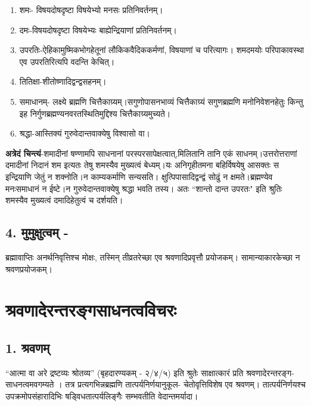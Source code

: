 \begin{enumerate}	
\item शमः- विषयदोषदृष्टा 	विषयेभ्यो 	मनसः 	प्रतिनिवर्तनम्।
\item दमः-विषयदोषदृष्टा 	विषयेभ्यः 	बाह्येन्द्रियाणां 	प्रतिनिवर्तनम्।
\item उपरतिः-ऐहिकामुष्मिकभोगहेतूनां 	लौकिकवैदिककर्मणां, 	विषयाणां 	च   परित्यागः। शमदमयोः 	परिपाकावस्था 	एव 	उपरतिरित्यपि 	वदन्ति केचित्।
\item तितिक्षा-शीतोष्णादिद्वन्द्वसहनम्।
\item समाधानम्- लक्ष्ये ब्रह्मणि चित्तैकाग्र्यम्।सगुणोपासनभाव्यं चित्तैकाग्र्यं 	 सगुणब्रह्मणि मनोनिवेशनहेतुः किन्तु 	इह निर्गुणब्रह्मण्यनवरतस्थितिमुद्दिश्य 	चित्तैकाग्र्यमुच्यते।
\item श्रद्धा-आस्तिक्यं गुरुवेदान्तवाक्येषु विश्वासो वा।
\end{enumerate}

\textbf{अत्रेदं चिन्त्यं}-शमादीनां षण्णामपि साधनानां परस्परसापेक्षत्वात्,मिलितानि तानि एकं साधनम्।उत्तरोत्तराणां दमादीनां निदानं शम इत्यतः तेषु शमस्यैव मुख्यत्वं बेध्यम्।यः अनिगृहीतमना बहिर्विषयेषु आसक्तः स इन्द्रियाणि जेतुं न शक्नोति।न काम्यकर्माणि सन्यसति। क्षुत्पिपासादिद्वन्द्वं सोढुं न क्षमते।ब्रह्मण्येव मनःसमाधानं न ईष्टे।न गुरुवेदान्तवाक्येषु श्रद्धा भवति तस्य। अतः “शान्तो दान्त उपरतः" इति श्रुतिः शमस्यैव मुख्यत्वं दमादिहेतुत्वं च दर्शयति।

\subsection*{4. मुमुक्षुत्वम् -} 

ब्रह्मावाप्तिः अनर्थनिवृत्तिश्च 	मोक्षः, तस्मिन् तीव्रतरेच्छा 	एव श्रवणादिप्रवृत्तौ प्रयोजकम्।  सामान्याकारकेच्छा न श्रवणप्रयोजकम्।

\section*{श्रवणादेरन्तरङ्गसाधनत्वविचरः}

\subsection*{1. श्रवणम्} 

“आत्मा वा अरे द्रष्टव्यः श्रोतव्य” (बृहदारण्यकम् - २/४/५) इति श्रुतेः साक्षात्कारं प्रति श्रवणादेरन्तरङ्ग-साधनत्वमवगम्यते । तत्र प्रत्यगभिन्नब्रह्मणि तात्पर्यनिर्णयानुकूल- चेतोवृत्तिविशेष एव श्रवणम्। तात्पर्यनिर्णयश्च उपक्रमोपसंहारादिभिः षड्विधतात्पर्यलिङ्गैः सम्भवतीति वेदान्तमर्यादा।

